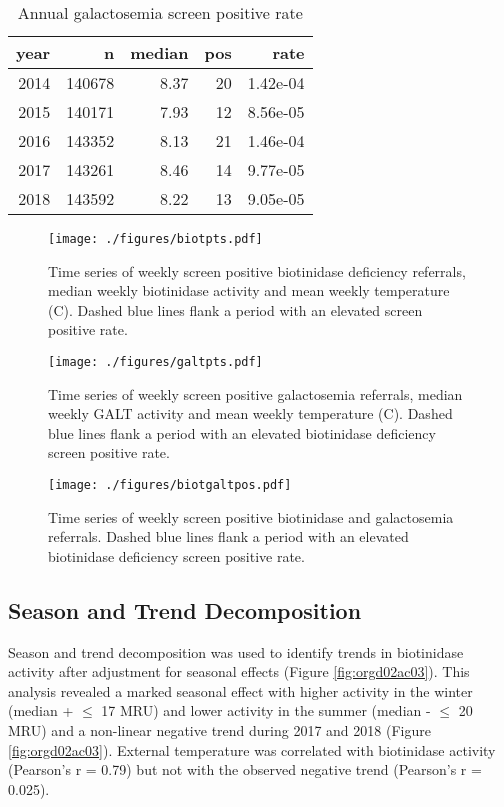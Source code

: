 \documentclass[review]{elsarticle}
\begin{document}
\begin{table}[ht]
\centering
\begin{tabular}{rrrrr}
  \hline
year & n & median & pos & rate \\ 
  \hline
2014 & 140678 & 8.37 &  20 & 1.42e-04 \\ 
  2015 & 140171 & 7.93 &  12 & 8.56e-05 \\ 
  2016 & 143352 & 8.13 &  21 & 1.46e-04 \\ 
  2017 & 143261 & 8.46 &  14 & 9.77e-05 \\ 
  2018 & 143592 & 8.22 &  13 & 9.05e-05 \\ 
   \hline
\end{tabular}
\caption{Annual galactosemia screen positive rate} 
\label{tab:galt_year}
\end{table}

\begin{figure}[htbp]
\centering
\texttt{[image: ./figures/biotpts.pdf]}
\caption{\label{fig:orgecad7e6}Time series of weekly screen positive biotinidase deficiency referrals, median weekly biotinidase activity and mean weekly temperature (\degree{}C). Dashed blue lines flank a period with an elevated screen positive rate.}
\end{figure}

\begin{figure}[htbp]
\centering
\texttt{[image: ./figures/galtpts.pdf]}
\caption{\label{fig:orgc170a39}Time series of weekly screen positive galactosemia referrals, median weekly GALT activity and mean weekly temperature (\degree{}C).  Dashed blue lines flank a period with an elevated biotinidase deficiency screen positive rate.}
\end{figure}


\begin{figure}[htbp]
\centering
\texttt{[image: ./figures/biotgaltpos.pdf]}
\caption{\label{fig:org69c2d25}Time series of weekly screen positive biotinidase and galactosemia referrals.  Dashed blue lines flank a period with an elevated biotinidase deficiency screen positive rate.}
\end{figure}


\clearpage

\subsection*{Season and Trend Decomposition}
\label{sec:orgc105f36}
Season and trend decomposition was used to identify trends in
biotinidase activity after adjustment for seasonal effects (Figure
\ref{fig:orgd02ac03}). This analysis revealed a marked seasonal effect with
higher activity in the winter (median + \(\le\) 17 MRU) and lower activity
in the summer (median - \(\le\) 20 MRU) and a non-linear negative trend
during 2017 and 2018 (Figure \ref{fig:orgd02ac03}). External temperature was
correlated with biotinidase activity (Pearson's r = 0.79) but not with
the observed negative trend (Pearson's r = 0.025).
\end{document}
